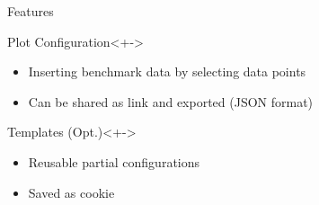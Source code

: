 
\begin{frame}{Features}
  \begin{block}{Plot Configuration}<+->
    \begin{itemize}[<+->]
       \item Inserting benchmark data by selecting data points
       \item Can be shared as link and exported (JSON format)
    \end{itemize}
  \end{block}
  \begin{block}{Templates (Opt.)}<+->
    \begin{itemize}[<+->]
      \item Reusable partial configurations
      \item Saved as cookie
    \end{itemize}
  \end{block}
  \onslide<+->
\end{frame}